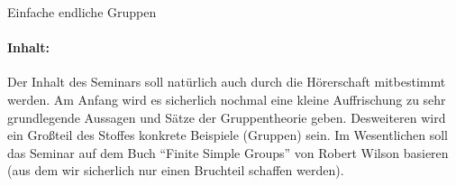 \documentclass{article}
\begin{document}
Einfache endliche Gruppen

\paragraph{Inhalt:} Der Inhalt des Seminars soll natürlich auch durch die Hörerschaft mitbestimmt werden.
Am Anfang wird es sicherlich nochmal eine kleine Auffrischung zu sehr grundlegende Aussagen und Sätze der Gruppentheorie geben.
Desweiteren wird ein Großteil des Stoffes konkrete Beispiele (Gruppen) sein. Im Wesentlichen soll das Seminar auf dem Buch ``Finite Simple Groups'' von Robert Wilson
basieren (aus dem wir sicherlich nur einen Bruchteil schaffen werden).
\end{document}
